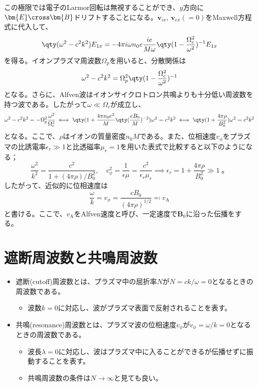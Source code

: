 この極限では電子のLarmor回転は無視することができ、$y$方向に$\bm{E}\cross\bm{B}$ドリフトすることになる。$\bm{v}_{ix},\,\bm{v}_{ex}(=0)$をMaxwell方程式に代入して、
\begin{equation}
	\qty(\omega^2 - c^2k^2)E_{1x} = -4\pi{}i\omega{}n_0e\frac{ie}{M\omega}\qty(1-\frac{\Omega^2_c}{\omega^2})^{-1}E_{1x}
\end{equation}
を得る。イオンプラズマ周波数$\Omega_{p}$を用いると、分散関係は
\begin{equation}
	\omega^2 - c^2k^2 = \Omega^2_{p}\qty(1-\frac{\Omega^2_c}{\omega^2})^{-1}
\end{equation}
となる。さらに、Alfven波はイオンサイクロトロン共鳴よりも十分低い周波数を持つ波である。したがって$\omega \ll \Omega_c$が成立し、
\begin{equation}
	\omega^2 - c^2k^2 = -\Omega^2_{p}\frac{\omega^2}{\Omega_c^2}\iff \qty(1+\frac{4\pi{}n_0e^2}{M}\qty(\frac{eB_0}{M})^{-2})\omega^2 = c^2k^2
	\iff \qty(1+\frac{4\pi\rho}{B_0^2})\omega^2 = c^2k^2
\end{equation}
となる。ここで、$\rho$はイオンの質量密度$n_0M$である。また、位相速度$v_{\phi}$をプラズマの比誘電率$\epsilon_r\gg 1$と比透磁率$\mu_r=1$を用いた表式で比較すると以下のようになる；
\begin{equation}
	\frac{\omega^2}{k^2} = \frac{c^2}{1+(4\pi\rho)/B_0^2},\quad v_{\phi}^2 = \frac{1}{\epsilon\mu} = \frac{c^2}{\epsilon_r\mu_r}
	\implies \epsilon_r = 1+\frac{4\pi\rho}{B_0^2} \gg 1\;。
\end{equation}
したがって、近似的に位相速度は
\begin{equation}
	\frac{\omega}{k} = v_{\phi} = \frac{cB_0}{(4\pi\rho)^{1/2}} \eqqcolon v_{\text{A}}
\end{equation}
と書ける。ここで、$v_{\text{A}}$をAlfven速度と呼び、一定速度で$\bm{B}_0$に沿った伝播をする。


\section{遮断周波数と共鳴周波数}
\begin{itemize}
	\item 遮断(cutoff)周波数とは、プラズマ中の屈折率$N$が$N=ck/\omega=0$となるときの周波数である。
	      \begin{itemize}
		      \item 波数$k=0$に対応し、波がプラズマ表面で反射されることを表す。
	      \end{itemize}
	\item 共鳴(resonance)周波数とは、プラズマ波の位相速度$v_{\phi}$が$v_{\phi}=\omega/k=0$となるときの周波数である。
	      \begin{itemize}
		      \item 波長$\lambda=0$に対応し、波はプラズマ中に入ることができるが伝播せずに振動することを表す。
		      \item 共鳴周波数の条件は$N\to\infty$と見ても良い。
	      \end{itemize}
\end{itemize}
